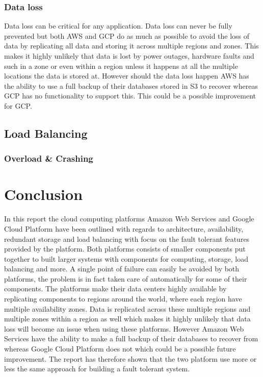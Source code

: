 \documentclass[11pt]{report}
\begin{document}
\subsection{Data loss}
Data loss can be critical for any application. Data loss can never be fully prevented but both AWS and GCP do as much as possible to avoid the loss of data by replicating all data and storing it across multiple regions and zones. This makes it highly unlikely that data is lost by power outages, hardware faults and such in a zone or even within a region unless it happens at all the multiple locations the data is stored at. However should the data loss happen AWS has the ability to use a full backup of their databases stored in S3 to recover whereas GCP has no functionality to support this. This could be a possible improvement for GCP.

\section{Load Balancing}


\subsection{Overload \& Crashing}



\chapter{Conclusion}
In this report the cloud computing platforms Amazon Web Services and Google Cloud Platform have been outlined with regards to architecture, availability, redundant storage and load balancing with focus on the fault tolerant features provided by the platform. Both platforms consists of smaller components put together to built larger systems with components for computing, storage, load balancing and more. A single point of failure can easily be avoided by both platforms, the problem is in fact taken care of automatically for some of their components. The platforms make their data centers highly available by replicating components to regions around the world, where each region have multiple availability zones. Data is replicated across these multiple regions and multiple zones within a region as well which makes it highly unlikely that data loss will become an issue when using these platforms. However Amazon Web Services have the ability to make a full backup of their databases to recover from whereas Google Cloud Platform does not which could be a possible future improvement. The report has therefore shown that the two platform use more or less the same approach for building a fault tolerant system.
\end{document}
